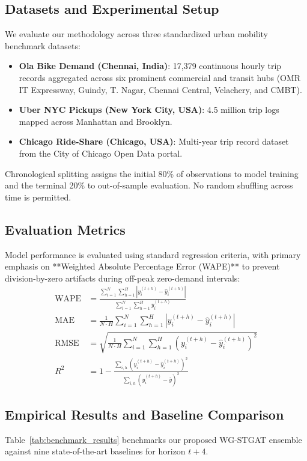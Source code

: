 \documentclass[10pt,journal,compsoc]{IEEEtran}
\begin{document}
\subsection{Datasets and Experimental Setup}
We evaluate our methodology across three standardized urban mobility benchmark datasets:
\begin{itemize}
    \item \textbf{Ola Bike Demand (Chennai, India)}: 17,379 continuous hourly trip records aggregated across six prominent commercial and transit hubs (OMR IT Expressway, Guindy, T. Nagar, Chennai Central, Velachery, and CMBT).
    \item \textbf{Uber NYC Pickups (New York City, USA)}: 4.5 million trip logs mapped across Manhattan and Brooklyn.
    \item \textbf{Chicago Ride-Share (Chicago, USA)}: Multi-year trip record dataset from the City of Chicago Open Data portal.
\end{itemize}

Chronological splitting assigns the initial 80\% of observations to model training and the terminal 20\% to out-of-sample evaluation. No random shuffling across time is permitted.

\subsection{Evaluation Metrics}
Model performance is evaluated using standard regression criteria, with primary emphasis on **Weighted Absolute Percentage Error (WAPE)** to prevent division-by-zero artifacts during off-peak zero-demand intervals:
\begin{align}
\text{WAPE} &= \frac{\sum_{i=1}^N \sum_{h=1}^H |y_i^{(t+h)} - \hat{y}_i^{(t+h)}|}{\sum_{i=1}^N \sum_{h=1}^H y_i^{(t+h)}} \\
\text{MAE} &= \frac{1}{N \cdot H} \sum_{i=1}^N \sum_{h=1}^H |y_i^{(t+h)} - \hat{y}_i^{(t+h)}| \\
\text{RMSE} &= \sqrt{\frac{1}{N \cdot H} \sum_{i=1}^N \sum_{h=1}^H (y_i^{(t+h)} - \hat{y}_i^{(t+h)})^2} \\
R^2 &= 1 - \frac{\sum_{i,h} (y_i^{(t+h)} - \hat{y}_i^{(t+h)})^2}{\sum_{i,h} (y_i^{(t+h)} - \bar{y})^2}
\end{align}

\subsection{Empirical Results and Baseline Comparison}
Table~\ref{tab:benchmark_results} benchmarks our proposed WG-STGAT ensemble against nine state-of-the-art baselines for horizon $t+4$.
\end{document}
